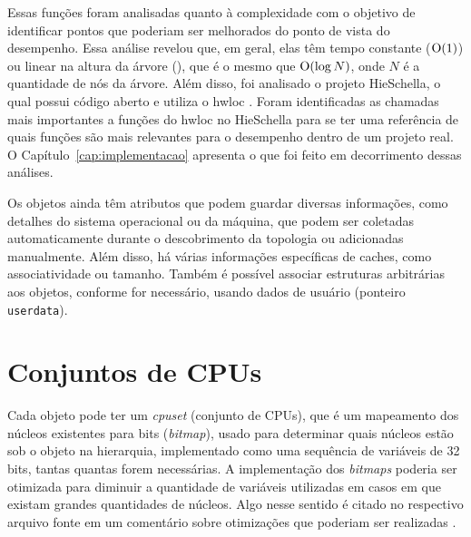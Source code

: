 Essas funções foram analisadas quanto à complexidade com o objetivo de identificar pontos que poderiam ser melhorados do ponto de vista do desempenho.
Essa análise revelou que, em geral, elas têm tempo constante ($\operatorname{O}(1)$) ou linear na altura da árvore (\Oalt), que é o mesmo que $\operatorname{O}(\log N)$, onde $N$ é a quantidade de nós da árvore.
Além disso, foi analisado o projeto HieSchella, o qual possui código aberto e utiliza o hwloc \cite{HieSchella}.
Foram identificadas as chamadas mais importantes a funções do hwloc no HieSchella para se ter uma referência
de quais funções são mais relevantes para o desempenho dentro de um projeto real.
O Capítulo~\ref{cap:implementacao} apresenta o que foi feito em decorrimento dessas análises.

Os objetos ainda têm atributos que podem guardar diversas informações, como detalhes do sistema operacional ou da máquina, que podem ser coletadas automaticamente durante o descobrimento da topologia ou adicionadas manualmente.
Além disso, há várias informações específicas de caches, como associatividade ou tamanho.
Também é possível associar estruturas arbitrárias aos objetos, conforme for necessário, usando dados de usuário (ponteiro \texttt{userdata}).


\section{Conjuntos de CPUs}
\label{sec:conjuntos_de_cpus}

Cada objeto pode ter um \textit{cpuset} (conjunto de CPUs), que é um mapeamento dos núcleos existentes para bits (\textit{bitmap}), usado para determinar quais núcleos estão sob o objeto na hierarquia, implementado como uma sequência de variáveis de 32 bits, tantas quantas forem necessárias.
A implementação dos \textit{bitmaps} poderia ser otimizada para diminuir a quantidade de variáveis utilizadas em casos em que existam grandes quantidades de núcleos.
Algo nesse sentido é citado no respectivo arquivo fonte em um comentário sobre otimizações que poderiam ser realizadas \cite{hwlocCod}.